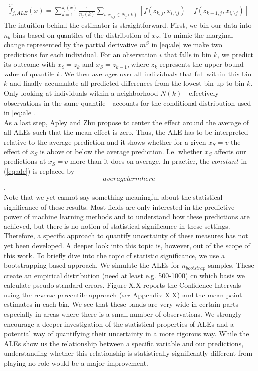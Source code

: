 \begin{align}
\hat{\tilde{f}}_{j, ALE}(x)=\sum_{k=1}^{k_j(x)} \frac{1}{n_j(k)}\sum_{i:x_{i,j}\in N_j(k)}[f(z_{k,j}, x_{i,\setminus j})-f(z_{k-1,j}, x_{i,\setminus j})] \label{eq:ale_estim}
\end{align}
The intuition behind the estimator is straightforward. First, we bin our data into $n_b$ bins based on quantiles of the distribution of $x_S$. To mimic the marginal change represented by the partial derivative $m^S$ in \ref{eq:ale} we make two predictions for each individual. For an observation $i$ that falls in bin $k$, we predict its outcome with $x_S=z_k$ and $x_S=z_{k-1}$, where $z_k$ represents the upper bound value of quantile $k$. We then averages over all individuals that fall within this bin $k$ and finally accumulate all predicted differences from the lowest bin up to bin $k$. Only looking at individuals within a neighborhood $N(k)$ - effectively observations in the same quantile - accounts for the conditional distribution used in \ref{eq:ale}. \\
As a last step, Apley and Zhu propose to center the effect around the average of all ALEs such that the mean effect is zero. Thus, the ALE has to be interpreted relative to the average prediction and it shows whether for a given $x_S=v$ the effect of $x_S$ is above or below the average prediction. I.e. whether $x_S$ affects our predictions at $x_S=v$ more than it does on average. In practice, the $constant$ in (\ref{eq:ale}) is replaced by $$average term here$$. \\
Note that we yet cannot say something meaningful about the statistical significance of these results. Most fields are only interested in the predictive power of machine learning methods and to understand how these predictions are achieved, but there is no notion of statistical significance in these settings. Therefore, a specific approach to quantify uncertainty of these measures has not yet been developed. A deeper look into this topic is, however, out of the scope of this work. To briefly dive into the topic of statistic significance, we use a bootstrapping based approach. We simulate the ALEs for $n_{bootstrap}$ samples. These create an empirical distribution (need at least e.g. 500-1000) on which basis we calculate pseudo-standard errors. Figure X.X reports the Confidence Intervals using the reverse percentile approach (see Appendix X.X) and the mean point estimates in each bin. We see that these bands are very wide in certain parts - especially in areas where there is a small number of observations. We strongly encourage a deeper investigation of the statistical properties of ALEs and a potential way of quantifying their uncertainty in a more rigorous way. While the ALEs show us the relationship between a specific variable and our predictions, understanding whether this relationship is statistically significantly different from playing no role would be a major improvement. \\
